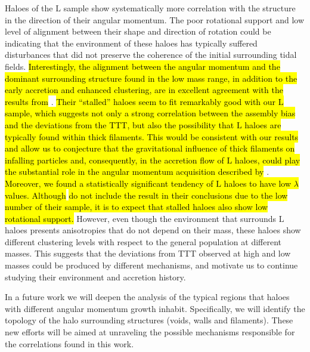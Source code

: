 \documentclass[fleqn,usenatbib]{mnras}
\newcommand{\Lh}{\mathrm{L}}
\begin{document}
Haloes of the $\Lh$ sample show systematically more correlation with the structure in the direction of their angular momentum. The poor rotational support and low level of alignment between their shape and direction of rotation could be indicating that the environment of these haloes has typically suffered disturbances that did not preserve the coherence of the initial surrounding tidal fields. \hl{Interestingly, the alignment between the angular momentum and the dominant surrounding structure found in the low mass range, in addition to the early accretion and enhanced clustering, are in excellent agreement with the results from} \citet{borzyszkowskietal2017}. \hl{Their ``stalled'' haloes seem to fit remarkably good with our $\Lh$ sample, which suggests not only a strong correlation between the assembly bias and the deviations from the TTT, but also the possibility that $\Lh$ haloes are typically found within thick filaments. This would be consistent with our results and allow us to conjecture that the gravitational influence of thick filaments on infalling particles and, consequently, in the accretion flow of $\Lh$ haloes, could play the substantial role in the angular momentum acquisition described by} \citeauthor{borzyszkowskietal2017}. \hl{Moreover, we found a statistically significant tendency of $\Lh$ haloes to have low $\lambda$ values. Although }\citeauthor{borzyszkowskietal2017}\hl{ do not include the result in their conclusions due to the low number of their sample, it is to expect that stalled haloes also show low rotational support.}
However, even though the environment that surrounds $\Lh$ haloes presents anisotropies that do not depend on their mass, these haloes show different clustering levels with respect to the general population at different masses. This suggests that the deviations from TTT observed at high and low masses could be produced by different mechanisms, and motivate us to continue studying their environment and accretion history.

In a future work we will deepen the analysis of the typical regions that haloes with different angular momentum growth inhabit. Specifically, we will identify the topology of the halo surrounding structures (voids, walls and filaments). These new efforts will be aimed at unraveling the possible mechanisms responsible for the correlations found in this work.

\end{document}
